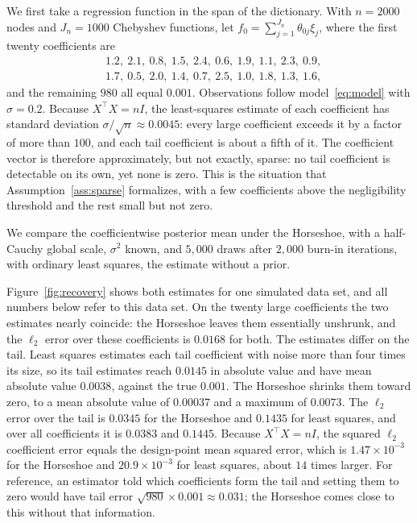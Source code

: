 We first take a regression function in the span of the dictionary. With $n=2000$ nodes and $J_n=1000$ Chebyshev functions, let $f_0=\sum_{j=1}^{J_n}\theta_{0j}\xi_j$, where the first twenty coefficients are
\begin{align*}
&1.2,\ 2.1,\ 0.8,\ 1.5,\ 2.4,\ 0.6,\ 1.9,\ 1.1,\ 2.3,\ 0.9,\\
&1.7,\ 0.5,\ 2.0,\ 1.4,\ 0.7,\ 2.5,\ 1.0,\ 1.8,\ 1.3,\ 1.6,
\end{align*}
and the remaining $980$ all equal $0.001$. Observations follow model~\eqref{eq:model} with $\sigma=0.2$. Because $X^\top X=nI$, the least-squares estimate of each coefficient has standard deviation $\sigma/\sqrt n\approx0.0045$: every large coefficient exceeds it by a factor of more than $100$, and each tail coefficient is about a fifth of it. The coefficient vector is therefore approximately, but not exactly, sparse: no tail coefficient is detectable on its own, yet none is zero. This is the situation that Assumption~\ref{ass:sparse} formalizes, with a few coefficients above the negligibility threshold and the rest small but not zero.

We compare the coefficientwise posterior mean under the Horseshoe, with a half-Cauchy global scale, $\sigma^2$ known, and $5{,}000$ draws after $2{,}000$ burn-in iterations, with ordinary least squares, the estimate without a prior.

Figure~\ref{fig:recovery} shows both estimates for one simulated data set, and all numbers below refer to this data set. On the twenty large coefficients the two estimates nearly coincide: the Horseshoe leaves them essentially unshrunk, and the $\ell_2$ error over these coefficients is $0.0168$ for both. The estimates differ on the tail. Least squares estimates each tail coefficient with noise more than four times its size, so its tail estimates reach $0.0145$ in absolute value and have mean absolute value $0.0038$, against the true $0.001$. The Horseshoe shrinks them toward zero, to a mean absolute value of $0.00037$ and a maximum of $0.0073$. The $\ell_2$ error over the tail is $0.0345$ for the Horseshoe and $0.1435$ for least squares, and over all coefficients it is $0.0383$ and $0.1445$. Because $X^\top X=nI$, the squared $\ell_2$ coefficient error equals the design-point mean squared error, which is $1.47\times10^{-3}$ for the Horseshoe and $20.9\times10^{-3}$ for least squares, about $14$ times larger. For reference, an estimator told which coefficients form the tail and setting them to zero would have tail error $\sqrt{980}\times0.001\approx0.031$; the Horseshoe comes close to this without that information.

